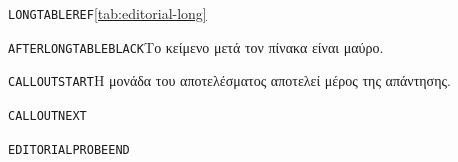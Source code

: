 \texttt{LONGTABLEREF}\quad\ref{tab:editorial-long}\par
\texttt{AFTERLONGTABLEBLACK}\quad Το κείμενο μετά τον πίνακα είναι μαύρο.
\begin{AttentionBox}
\texttt{CALLOUTSTART}\quad Η μονάδα του αποτελέσματος αποτελεί μέρος της απάντησης.
\end{AttentionBox}
\EditorialProbeParagraph
\clearpage
\texttt{CALLOUTNEXT}\par\EditorialProbeParagraph
\texttt{EDITORIALPROBEEND}
